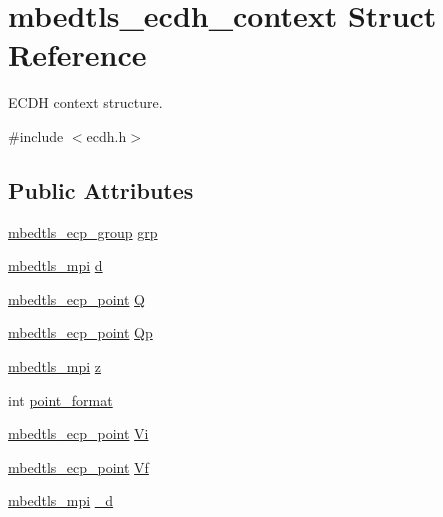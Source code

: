 \hypertarget{structmbedtls__ecdh__context}{\section{mbedtls\-\_\-ecdh\-\_\-context Struct Reference}
\label{structmbedtls__ecdh__context}
}


E\-C\-D\-H context structure.  




{\ttfamily \#include $<$ecdh.\-h$>$}

\subsection*{Public Attributes}
\begin{DoxyCompactItemize}
\item 
\hyperlink{structmbedtls__ecp__group}{mbedtls\-\_\-ecp\-\_\-group} \hyperlink{structmbedtls__ecdh__context_a9fd1b03576203de87a92a2d49a4d20ed}{grp}
\item 
\hyperlink{structmbedtls__mpi}{mbedtls\-\_\-mpi} \hyperlink{structmbedtls__ecdh__context_a22e51b2ea7d4728e48e8897535831cf4}{d}
\item 
\hyperlink{structmbedtls__ecp__point}{mbedtls\-\_\-ecp\-\_\-point} \hyperlink{structmbedtls__ecdh__context_af2657e12e87be5b3e73bcf1ea2941d0b}{Q}
\item 
\hyperlink{structmbedtls__ecp__point}{mbedtls\-\_\-ecp\-\_\-point} \hyperlink{structmbedtls__ecdh__context_a64ecde7d95dcc725d6af5f8e3ce542ca}{Qp}
\item 
\hyperlink{structmbedtls__mpi}{mbedtls\-\_\-mpi} \hyperlink{structmbedtls__ecdh__context_abfd253d99f23c57cbeafc41985db764c}{z}
\item 
int \hyperlink{structmbedtls__ecdh__context_ae7ae7b0231e898b0d973df360aea8f17}{point\-\_\-format}
\item 
\hyperlink{structmbedtls__ecp__point}{mbedtls\-\_\-ecp\-\_\-point} \hyperlink{structmbedtls__ecdh__context_a6e374b0be49dce0fb02ca8ccfbfe1fee}{Vi}
\item 
\hyperlink{structmbedtls__ecp__point}{mbedtls\-\_\-ecp\-\_\-point} \hyperlink{structmbedtls__ecdh__context_a2ee12052791b2f212047a16b4e0dcc77}{Vf}
\item 
\hyperlink{structmbedtls__mpi}{mbedtls\-\_\-mpi} \hyperlink{structmbedtls__ecdh__context_af5412a43eb79b11a6cc13c3a9af55e13}{\-\_\-d}
\end{DoxyCompactItemize}


